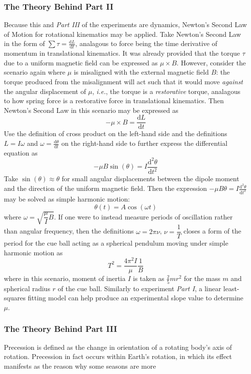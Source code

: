 \documentclass[12pt]{article}
\newcommand{\totder}[2][]{\frac{\mathrm{d}#1}{\mathrm{d}#2}} %
\newcommand{\sectotder}[2][]{\frac{\mathrm{d^2}#1}{\mathrm{d}#2^2}}
\begin{document}
\begin{multicols}{2}
\subsubsection{The Theory Behind Part II}
Because this and \textit{Part III} of the experiments are dynamics,
Newton's Second Law of Motion for rotational kinematics may be applied.
Take Newton's Second Law in the form of $\displaystyle\sum\tau=\totder[L]{t}$,
analagous to force being the time derivative of momentum in translational kinematics.
It was already provided that the torque $\tau$ due to a uniform magnetic field can be expressed as $\mu\times B$. 
However, consider the scenario again where $\mu$ is misaligned with the external magnetic field $B$:
the torque produced from the misalignment will act such that it would move \textit{against}
the angular displacement of $\mu$, \textit{i.e.}, the torque is a \textit{restorative} torque,
analagous to how spring force is a restorative force in translational kinematics.
Then Newton's Second Law in this scenario may be expressed as
$$-\mu\times B=\totder[L]{t}$$
Use the definition of cross product on the left-hand side and the definitions
$L=I\omega$ and $\displaystyle \omega=\totder[\theta]{t}$ on the right-hand side
to further express the differential equation as
$$-\mu B\sin(\theta)=I\sectotder[\theta]{t}$$
Take $\sin(\theta)\approx\theta$ for small angular displacements between the dipole moment and the direction of the
uniform magnetic field. Then the expression $\displaystyle -\mu B\theta=I\sectotder[\theta]{t}$ may be solved as simple
harmonic motion:
$$\theta(t)=A\cos(\omega t)$$
where $\omega=\sqrt{\dfrac{\mu}{I}B}$. If one were to instead measure periods of oscillation rather than angular frequency,
then the definitions $\omega=2\pi\nu$, $\nu=\dfrac{1}{T}$ closes a form of the period for the cue ball acting as a spherical
pendulum moving under simple harmonic motion as
$$T^2=\frac{4\pi^2I}{\mu}\frac{1}{B}$$
where in this scenario, moment of inertia $I$ is taken as $\frac{2}{5}mr^2$ for the mass $m$ and spherical radius $r$ of the cue ball.
Similarly to experiment \textit{Part I}, a linear least-squares fitting model can help produce an experimental slope value to determine $\mu$.

\subsubsection{ The Theory Behind Part III}
Precession is defined as the change in orientation of a rotating body's axis of rotation.
Precession in fact occurs within Earth's rotation, in which its effect manifests as the reason why
some seasons are more
\begin{figure}[H]
    \centering
\end{figure}
\end{multicols}
\end{document}
